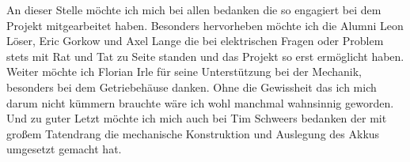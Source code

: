 An dieser Stelle möchte ich mich bei allen bedanken die so engagiert bei dem Projekt mitgearbeitet haben. Besonders hervorheben möchte ich die Alumni Leon Löser, Eric Gorkow und Axel Lange die bei elektrischen Fragen oder Problem stets mit Rat und Tat zu Seite standen und das Projekt so erst ermöglicht haben. Weiter möchte ich Florian Irle für seine Unterstützung bei der Mechanik, besonders bei dem Getriebehäuse danken. Ohne die Gewissheit das ich mich darum nicht kümmern brauchte wäre ich wohl manchmal wahnsinnig geworden. Und zu guter Letzt möchte ich mich auch bei Tim Schweers bedanken der mit großem Tatendrang die mechanische Konstruktion und Auslegung des Akkus umgesetzt gemacht hat.